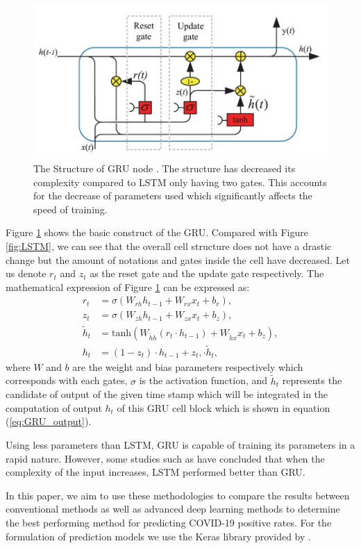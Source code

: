 \begin{figure}[ht]
    \centering
    \includegraphics[width=12cm]{images/GRU.png}
    \caption{The Structure of GRU node \citep{LSTM_GRU_description}. The structure has decreased its complexity compared to LSTM only having two gates. This accounts for the decrease of parameters used which significantly affects the speed of training.}
    \label{fig:GRU}
\end{figure}

Figure \ref{fig:GRU} shows the basic construct of the GRU. Compared with Figure \ref{fig:LSTM}, we can see that the overall cell structure does not have a drastic change but the amount of notations and gates inside the cell have decreased. Let us denote $r_{t}$ and $z_{t}$ as the reset gate and the update gate respectively. The mathematical expression of Figure \ref{fig:GRU} can be expressed as: 
\begin{align}
    r_{t} &=\sigma\left(W_{r h} h_{t-1}+W_{r x} x_{t}+b_{r}\right), \\ z_{t} &=\sigma\left(W_{z h} h_{t-1}+W_{z x} x_{t}+b_{z}\right), \\ \tilde{h}_{t} &=\mathrm{tanh} \left(W_{\tilde{h} h}\left(r_{t} \cdot h_{t-1}\right)+W_{\tilde{h} x} x_{t}+b_{z}\right), \label{eq:GRU_output}\\ 
    h_{t} &=\left(1-z_{t}\right) \cdot h_{t-1}+z_{t}, \cdot \tilde{h}_{t},
\end{align}
where $W$ and $b$ are the weight and bias parameters respectively which corresponds with each gates, $\sigma$ is the activation function, and $\tilde{h}_{t}$ represents the candidate of output of the given time stamp which will be integrated in the computation of output $h_{t}$ of this GRU cell block which is shown in equation (\ref{eq:GRU_output}).

Using less parameters than LSTM, GRU is capable of training its parameters in a rapid nature. However, some studies such as \citet{LSTM_GRU_comparison} have concluded that when the complexity of the input increases, LSTM performed better than GRU. 

In this paper, we aim to use these methodologies to compare the results between conventional methods as well as advanced deep learning methods to determine the best performing method for predicting COVID-19 positive rates. For the formulation of prediction models we use the Keras library provided by \citet{keras}.